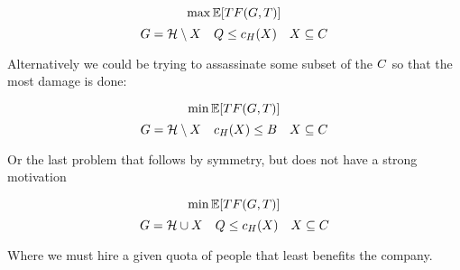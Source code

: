 $$ \max \mathbb{E}[TF(G,T)] $$
$$ G = \mathcal{H} \setminus X \quad Q \le c_H(X) \quad  X \subseteq C $$

Alternatively we could be trying to assassinate some subset of the ${C}$ so that the most damage is done:

$$ \min \mathbb{E}[TF(G,T)] $$
$$ G = \mathcal{H} \setminus X \quad c_H(X) \le B \quad  X \subseteq C $$

Or the last problem that follows by symmetry, but does not have a strong motivation

$$ \min \mathbb{E}[TF(G,T)] $$
$$ G = \mathcal{H} \cup X \quad Q \le c_H(X) \quad  X \subseteq C $$

Where we must hire a given quota of people that least benefits the company. 


